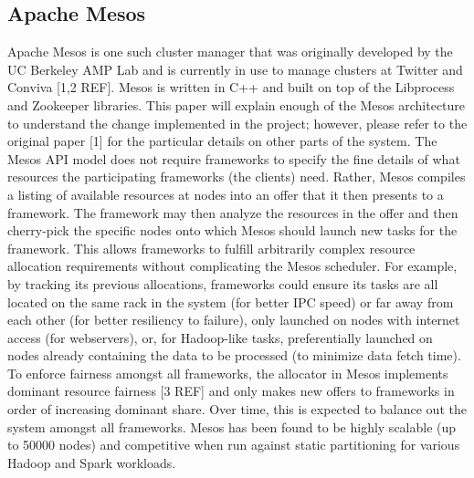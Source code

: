 \subsection{Apache Mesos}
Apache Mesos is one such cluster manager that was originally developed by the UC Berkeley AMP
Lab and is currently in use to manage clusters at Twitter and Conviva [1,2 REF]. Mesos is
written in C++ and built on top of the Libprocess and Zookeeper libraries. This paper will
explain enough of the Mesos architecture to understand the change implemented in the project;
however, please refer to the original paper [1] for the particular details on other parts of
the system. The Mesos API model does not require frameworks to specify the fine details of what
resources the participating frameworks (the clients) need.  Rather, Mesos compiles a listing of
available resources at nodes into an offer that it then presents to a framework. The framework
may then analyze the resources in the offer and then cherry-pick the specific nodes onto which
Mesos should launch new tasks for the framework. This allows frameworks to fulfill arbitrarily
complex resource allocation requirements without complicating the Mesos scheduler. For example,
by tracking its previous allocations, frameworks could ensure its tasks are all located on the
same rack in the system (for better IPC speed) or far away from each other (for better
resiliency to failure), only launched on nodes with internet access (for webservers), or, for
Hadoop-like tasks, preferentially launched on nodes already containing the data to be processed
(to minimize data fetch time). To enforce fairness amongst all frameworks, the allocator in
Mesos implements dominant resource fairness [3 REF] and only makes new offers to frameworks in
order of increasing dominant share. Over time, this is expected to balance out the system
amongst all frameworks. Mesos has been found to be highly scalable (up to 50000 nodes) and
competitive when run against static partitioning for various Hadoop and Spark workloads.

